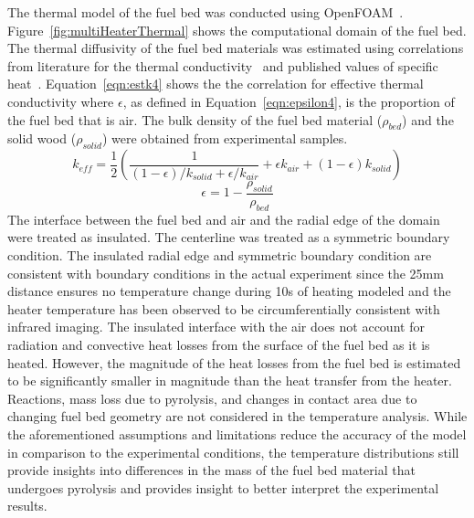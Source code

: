     The thermal model of the fuel bed was conducted using OpenFOAM~\cite{Foundation2020}. Figure~\ref{fig:multiHeaterThermal} shows the computational domain of the fuel bed. The thermal diffusivity of the fuel bed materials was estimated using correlations from literature for the thermal conductivity~\cite{bergman2011fundamentals} and published values of specific heat~\cite{Parker1986}. Equation~\ref{eqn:estk4} shows the the correlation for effective thermal conductivity where $\epsilon$, as defined in Equation~\ref{eqn:epsilon4}, is the proportion of the fuel bed that is air. The bulk density of the fuel bed material ($\rho_{bed}$) and the solid wood ($\rho_{solid}$) were obtained from experimental samples. 
        \begin{equation}
            k_{eff} = \frac{1}{2} \left(\frac{1}{\left( 1 - \epsilon \right)/k_{solid} + \epsilon/k_{air}} +  \epsilon k_{air} + \left(1-\epsilon \right) k_{solid} \right)
            \label{eqn:estk4}
        \end{equation}
        \begin{equation}
            \epsilon = 1- \frac{\rho_{solid}}{\rho_{bed}}
            \label{eqn:epsilon4}
        \end{equation}
    The interface between the fuel bed and air and the radial edge of the domain were treated as insulated. The centerline was treated as a symmetric boundary condition. The insulated radial edge and symmetric boundary condition are consistent with boundary conditions in the actual experiment since the 25\si{\milli\meter} distance ensures no temperature change during 10\si{\second} of heating modeled and the heater temperature has been observed to be circumferentially consistent with infrared imaging. The insulated interface with the air does not account for radiation and convective heat losses from the surface of the fuel bed as it is heated. However, the magnitude of the heat losses from the fuel bed is estimated to be significantly smaller in magnitude than the heat transfer from the heater. Reactions, mass loss due to pyrolysis, and changes in contact area due to changing fuel bed geometry are not considered in the temperature analysis. While the aforementioned assumptions and limitations reduce the accuracy of the model in comparison to the experimental conditions, the temperature distributions still provide insights into differences in the mass of the fuel bed material that undergoes pyrolysis and provides insight to better interpret the experimental results. 
